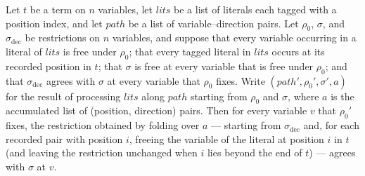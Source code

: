 \begin{lemma}
\label{SwitchingLemma.roundtrip_inv_hC'}
\leanok
{}
Let $t$ be a term on $n$ variables, let $\mathit{lits}$ be a list of literals each
tagged with a position index, and let $\mathit{path}$ be a list of variable–direction
pairs. Let $\rho_0$, $\sigma$, and $\sigma_{\mathrm{dec}}$ be restrictions on $n$
variables, and suppose that every variable occurring in a literal of $\mathit{lits}$ is
free under $\rho_0$; that every tagged literal in $\mathit{lits}$ occurs at its recorded
position in $t$; that $\sigma$ is free at every variable that is free under $\rho_0$;
and that $\sigma_{\mathrm{dec}}$ agrees with $\sigma$ at every variable that $\rho_0$
fixes. Write $(\mathit{path}', \rho_0', \sigma', a)$ for the result of processing
$\mathit{lits}$ along $\mathit{path}$ starting from $\rho_0$ and $\sigma$, where $a$ is
the accumulated list of (position, direction) pairs. Then for every variable $v$ that
$\rho_0'$ fixes, the restriction obtained by folding over $a$ — starting from
$\sigma_{\mathrm{dec}}$ and, for each recorded pair with position $i$, freeing the
variable of the literal at position $i$ in $t$ (and leaving the restriction unchanged
when $i$ lies beyond the end of $t$) — agrees with $\sigma$ at $v$.
\end{lemma}

